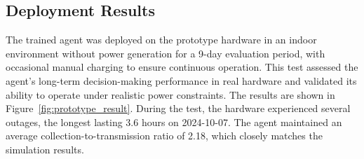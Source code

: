 \documentclass[10pt]{cai}
\begin{document}
\subsection{Deployment Results}
The trained agent was deployed on the prototype hardware in an indoor environment without power generation for a 9-day evaluation period, with occasional manual charging to ensure continuous operation.  
This test assessed the agent’s long-term decision-making performance in real hardware and validated its ability to operate under realistic power constraints. The results are shown in Figure~\ref{fig:prototype_result}.
During the test, the hardware experienced several outages, the longest lasting 3.6 hours on 2024-10-07.  
The agent maintained an average collection-to-transmission ratio of 2.18, which closely matches the simulation results.  
\end{document}
